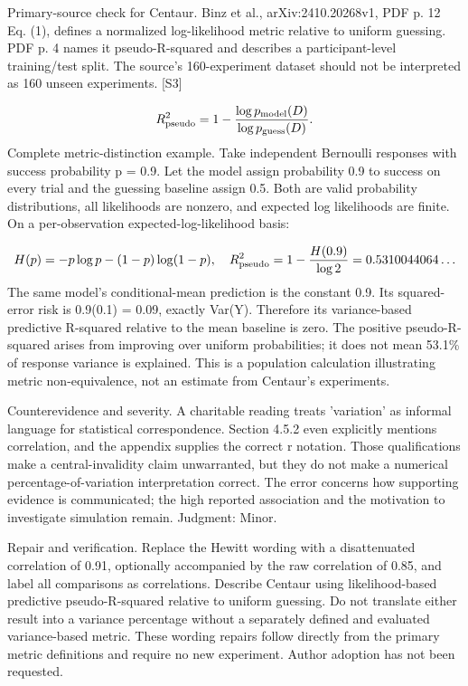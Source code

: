 \documentclass[10pt]{article}
\begin{document}
Primary-source check for Centaur. Binz et al., arXiv:2410.20268v1, PDF p. 12 Eq. (1), defines a normalized log-likelihood metric relative to uniform guessing. PDF p. 4 names it pseudo-R-squared and describes a participant-level training/test split. The source’s 160-experiment dataset should not be interpreted as 160 unseen experiments. [S3]\par
\[R^2_{\rm pseudo}=1-\frac{\log p_{\rm model}(D)}{\log p_{\rm guess}(D)}.\] Complete metric-distinction example. Take independent Bernoulli responses with success probability p = 0.9. Let the model assign probability 0.9 to success on every trial and the guessing baseline assign 0.5. Both are valid probability distributions, all likelihoods are nonzero, and expected log likelihoods are finite. On a per-observation expected-log-likelihood basis:\par
\[H(p)=-p\log p-(1-p)\log(1-p),\quad R^2_{\rm pseudo}=1-\frac{H(0.9)}{\log 2}=0.5310044064\ldots\] The same model’s conditional-mean prediction is the constant 0.9. Its squared-error risk is 0.9(0.1) = 0.09, exactly Var(Y). Therefore its variance-based predictive R-squared relative to the mean baseline is zero. The positive pseudo-R-squared arises from improving over uniform probabilities; it does not mean 53.1\% of response variance is explained. This is a population calculation illustrating metric non-equivalence, not an estimate from Centaur’s experiments.\par
Counterevidence and severity. A charitable reading treats ’variation’ as informal language for statistical correspondence. Section 4.5.2 even explicitly mentions correlation, and the appendix supplies the correct r notation. Those qualifications make a central-invalidity claim unwarranted, but they do not make a numerical percentage-of-variation interpretation correct. The error concerns how supporting evidence is communicated; the high reported association and the motivation to investigate simulation remain. Judgment: Minor.\par
Repair and verification. Replace the Hewitt wording with a disattenuated correlation of 0.91, optionally accompanied by the raw correlation of 0.85, and label all comparisons as correlations. Describe Centaur using likelihood-based predictive pseudo-R-squared relative to uniform guessing. Do not translate either result into a variance percentage without a separately defined and evaluated variance-based metric. These wording repairs follow directly from the primary metric definitions and require no new experiment. Author adoption has not been requested.\par
\end{document}
